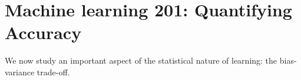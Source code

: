 \documentclass{article}
\begin{document}



\newpage

\section{Machine learning 201: Quantifying Accuracy}
We now study an important aspect of the statistical nature of learning: the bias-variance trade-off.
\end{document}
